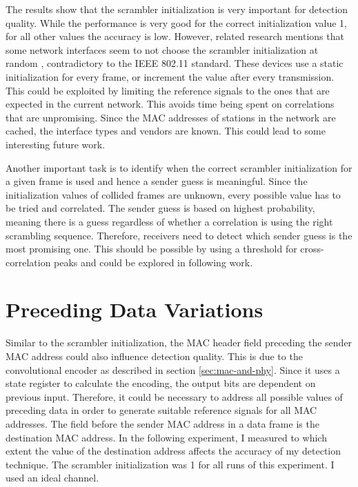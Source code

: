 The results show that the scrambler initialization is very important for detection quality. While the performance is very good for the correct initialization value 1, for all other values the accuracy is low. However, related research mentions that some network interfaces seem to not choose the scrambler initialization at random \cite{noubir2016}, contradictory to the IEEE 802.11 standard. These devices use a static initialization for every frame, or increment the value after every transmission. This could be exploited by limiting the reference signals to the ones that are expected in the current network. This avoids time being spent on correlations that are unpromising. Since the \gls{MAC} addresses of stations in the network are cached, the interface types and vendors are known. This could lead to some interesting future work.

Another important task is to identify when the correct scrambler initialization for a given frame is used and hence a sender guess is meaningful. Since the initialization values of collided frames are unknown, every possible value has to be tried and correlated. The sender guess is based on highest probability, meaning there is a guess regardless of whether a correlation is using the right scrambling sequence. Therefore, receivers need to detect which sender guess is the most promising one. This should be possible by using a threshold for cross-correlation peaks and could be explored in following work.



\section{Preceding Data Variations}\label{sec:ex-destination}

Similar to the scrambler initialization, the \gls{MAC} header field preceding the sender \gls{MAC} address could also influence detection quality. This is due to the convolutional encoder as described in section \ref{sec:mac-and-phy}. Since it uses a state register to calculate the encoding, the output bits are dependent on previous input. Therefore, it could be necessary to address all possible values of preceding data in order to generate suitable reference signals for all MAC addresses. The field before the sender \gls{MAC} address in a data frame is the destination \gls{MAC} address. In the following experiment, I measured to which extent the value of the destination address affects the accuracy of my detection technique. The scrambler initialization was 1 for all runs of this experiment. I used an ideal channel.\\

